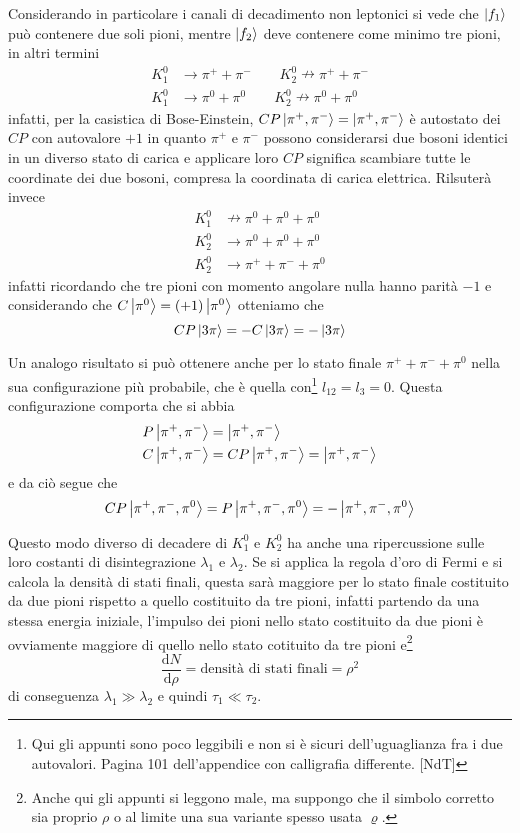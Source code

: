 Considerando in particolare i canali di decadimento non leptonici si vede che
$\Ket{f_1}$ può contenere due soli pioni, mentre $\Ket{f_2}$ deve contenere come
minimo tre pioni, in altri termini
\begin{equation*}
  \begin{split}
	K_1^0 &\rightarrow \pi^+ + \pi^- \qquad K_2^0 \nrightarrow \pi^+ + \pi^-\\
	K_1^0 &\rightarrow \pi^0 + \pi^0 \qquad K_2^0 \nrightarrow \pi^0 + \pi^0
  \end{split}
\end{equation*}
infatti, per la casistica di Bose-Einstein, $CP\Ket{\pi^+,\pi^-}
=\Ket{\pi^+,\pi^-}$ è autostato dei $CP$ con autovalore $+1$ in quanto $\pi^+$ e
$\pi^-$ possono considerarsi due bosoni identici in un diverso stato di carica e
applicare loro $CP$ significa scambiare tutte le coordinate dei due bosoni,
compresa la coordinata di carica elettrica. Rilsuterà invece
\[
  \begin{split}
	K_1^0 &\nrightarrow \pi^0 + \pi^0 + \pi^0\\
	K_2^0 &\rightarrow \pi^0 + \pi^0 + \pi^0\\
	K_2^0 &\rightarrow \pi^+ + \pi^- + \pi^0
  \end{split}
\]
infatti ricordando che tre pioni con momento angolare nulla hanno parità $-1$ e
considerando che $C\Ket{\pi^0} = (+1)\Ket{\pi^0}$ otteniamo che
\[
  CP\Ket{3\pi} = -C\Ket{3\pi} = -\Ket{3\pi}
\]

Un analogo risultato si può ottenere anche per lo stato finale $\pi^+ + \pi^- +
\pi^0$ nella sua configurazione più probabile, che è quella con\footnote{Qui gli
  appunti sono poco leggibili e non si è sicuri dell'uguaglianza fra i due
autovalori. Pagina 101 dell'appendice con calligrafia differente. [NdT]} $l_{12}
= l_3 = 0$. Questa configurazione comporta che si abbia
\begin{equation*}
  \begin{split}
	P\Ket{\pi^+,\pi^-} &= \Ket{\pi^+, \pi^-}\\
	C\Ket{\pi^+,\pi^-} &= CP\Ket{\pi^+, \pi^-} = \Ket{\pi^+, \pi^-}
  \end{split}
\end{equation*}
e da ciò segue che
\begin{equation}
  CP\Ket{\pi^+, \pi^-, \pi^0} = P\Ket{\pi^+, \pi^-,\pi^0}= -\Ket{\pi^+,
  \pi^-,\pi^0}
\end{equation}

Questo modo diverso di decadere di $K_1^0$ e $K_2^0$ ha anche una ripercussione
sulle loro costanti di disintegrazione $\lambda_1$ e $\lambda_2$. Se si applica
la regola d'oro di Fermi e si calcola la densità di stati finali, questa sarà
maggiore per lo stato finale costituito da due pioni rispetto a quello
costituito da tre pioni, infatti partendo da una stessa energia iniziale,
l'impulso dei pioni nello stato costituito da due pioni è ovviamente maggiore di
quello nello stato cotituito da tre pioni e\footnote{Anche qui gli appunti si
  leggono male, ma suppongo che il simbolo corretto sia proprio $\rho$ o al
limite una sua variante spesso usata $\varrho$.}
\[
  \frac{\text{d}N}{\text{d}\rho} = \text{densità di stati finali} = \rho^2
\]
di conseguenza $\lambda_1 \gg\lambda_2$ e quindi $\tau_1\ll\tau_2$.

